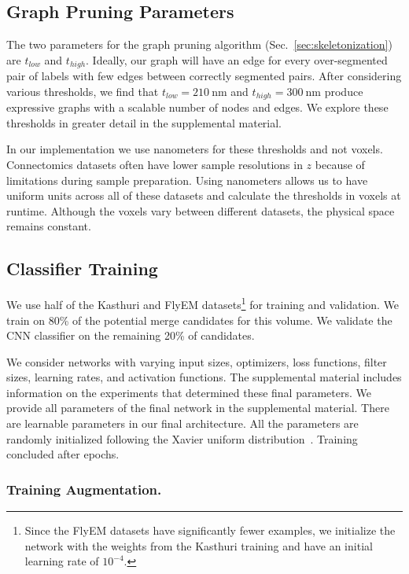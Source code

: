 \subsection{Graph Pruning Parameters}

The two parameters for the graph pruning algorithm (Sec.~\ref{sec:skeletonization}) are $t_{low}$ and $t_{high}$. 
Ideally, our graph will have an edge for every over-segmented pair of labels with few edges between correctly segmented pairs. 
After considering various thresholds, we find that $t_{low} = \SI{210}{\nano\meter}$ and $t_{high} = \SI{300}{\nano\meter}$ produce expressive graphs with a scalable number of nodes and edges.
We explore these thresholds in greater detail in the supplemental material.

In our implementation we use nanometers for these thresholds and not voxels. 
Connectomics datasets often have lower sample resolutions in $z$ because of limitations during sample preparation. 
Using nanometers allows us to have uniform units across all of these datasets and calculate the thresholds in voxels at runtime.
Although the voxels vary between different datasets, the physical space remains constant. 


\subsection{Classifier Training}
\label{sec:network-parameters}

We use half of the Kasthuri and FlyEM datasets\footnote{Since the FlyEM datasets have significantly fewer examples, we initialize the network with the weights from the Kasthuri training and have an initial learning rate of $10^{-4}$.} for training and validation. 
We train on 80\% of the potential merge candidates for this volume.
We validate the CNN classifier on the remaining 20\% of candidates. 


We consider networks with varying input sizes, optimizers, loss functions, filter sizes, learning rates, and activation functions. 
The supplemental material includes information on the experiments that determined these final parameters. 
We provide all parameters of the final network in the supplemental material. 
There are  learnable parameters in our final architecture. 
All the parameters are randomly initialized following the Xavier uniform distribution~\cite{glorot2010understanding}. 
Training concluded after  epochs.


\subsubsection{Training Augmentation.}

